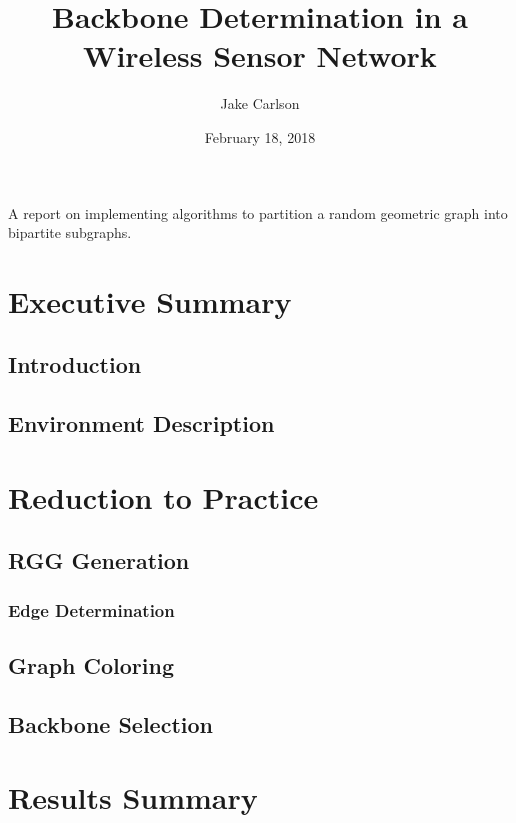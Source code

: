 \documentclass{article}
\begin{document}
\title{Backbone Determination in a Wireless Sensor Network}
\author{Jake Carlson}
\date{February 18, 2018}
\maketitle

\abstract
A report on implementing algorithms to partition a random geometric graph into bipartite subgraphs.
\newpage

\tableofcontents
\newpage

\section{Executive Summary}

    \subsection{Introduction}

    \subsection{Environment Description}

\section{Reduction to Practice}

    \subsection{RGG Generation}

        \subsubsection{Edge Determination}

    \subsection{Graph Coloring}

    \subsection{Backbone Selection}

\section{Results Summary}

\newpage

\begin{thebibliography}{10}

\end{thebibliography}
\end{document}
